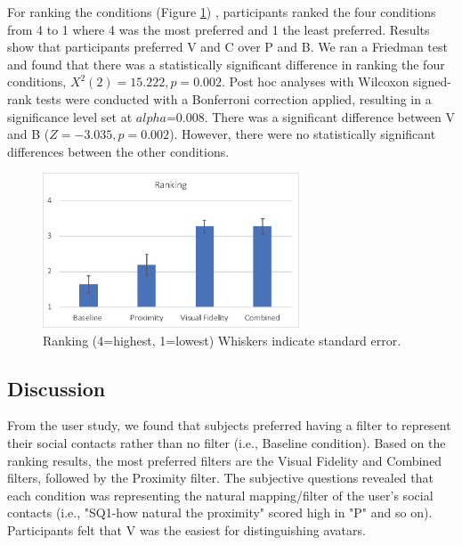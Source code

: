 
For ranking the conditions 
(Figure \ref{fig:contacts:ranking})
, participants ranked the four conditions from 4 to 1 where 4 was the most preferred and 1 the least preferred. Results show that participants preferred V and C over P and B. We ran a Friedman test and found that there was a statistically significant difference in ranking the four conditions, $X^2(2)=15.222,p=0.002$. Post hoc analyses with Wilcoxon signed-rank tests were conducted with a Bonferroni correction applied, resulting in a significance level set at $alpha$=0.008. There was a significant difference between V and B  ($Z=-3.035, p=0.002$). However, there were no statistically significant differences between the other conditions.

\begin{figure}[ht]
	\centering
	\includegraphics[width=3in]{images/analysis-images-04.eps}
	\caption{Ranking (4=highest, 1=lowest) Whiskers indicate standard error.}
	\label{fig:contacts:ranking}
\end{figure}


\subsection{Discussion}

From the user study, we found that subjects preferred having a filter to represent their social contacts rather than no filter (i.e., Baseline condition). Based on the ranking results, the most preferred filters are the Visual Fidelity and Combined filters, followed by the Proximity filter.
The subjective questions revealed that each condition was representing the natural mapping/filter of the user's social contacts (i.e., "SQ1-how natural the proximity" scored high in "P" and so on). Participants felt that V was the easiest for distinguishing avatars.

